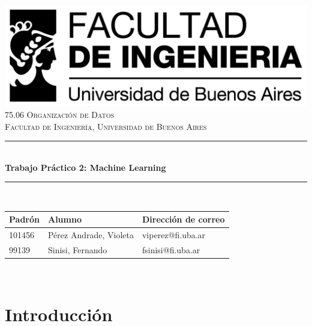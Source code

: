 \documentclass[12pt,a4paper]{article}
\newcommand{\thetitle}{Trabajo Práctico 2: Machine Learning}
\begin{document}
\begin{titlepage}
	\centering
    \vspace*{2.5cm}

    \includegraphics[scale = 0.7]{imgs/logofiuba.jpg}\\[2.0 cm]

	\textsc{\Large 75.06 Organización de Datos}\\[0.7 cm]
	\textsc{Facultad de Ingeniería, Universidad de Buenos Aires}\\[0.5 cm]

	\rule{0.94\linewidth}{0.2 mm} \\[0.4 cm]
	{\huge \bfseries \thetitle}\\
	\rule{0.94\linewidth}{0.2 mm} \\[1.2 cm]

    \begin{tabular}{lll} %
        \toprule
        Padrón & Alumno & Dirección de correo \\
        \midrule
        101456 & Pérez Andrade, Violeta  & viperez@fi.uba.ar \\
        99139 & Sinisi, Fernando & fsinisi@fi.uba.ar \\
        \bottomrule
    \end{tabular}\\


    \vspace*{1cm}

\end{titlepage}

\tableofcontents
\newpage

\section{Introducción}
\end{document}
